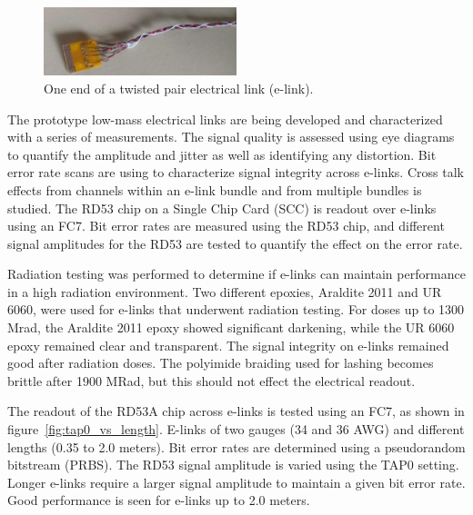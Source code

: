 \documentclass[a4paper,11pt]{article}
\begin{document}
\begin{figure}[htbp]
\centering
\includegraphics[width=0.5\textwidth,origin=c]{../figures/e-link-1.jpg}
\caption{
\label{fig:elink}
One end of a twisted pair electrical link (e-link).
}
\end{figure}




The prototype low-mass electrical links are being developed and characterized with a series of measurements.
The signal quality is assessed using eye diagrams to quantify the amplitude and jitter as well as identifying any distortion.
Bit error rate scans are using to characterize signal integrity across e-links.
Cross talk effects from channels within an e-link bundle and from multiple bundles is studied.
The RD53 chip on a Single Chip Card (SCC) is readout over e-links using an FC7.
Bit error rates are measured using the RD53 chip, and different signal amplitudes for the RD53 are tested to quantify the effect on the error rate.

Radiation testing was performed to determine if e-links can maintain performance in a high radiation environment.
Two different epoxies, Araldite 2011 and UR 6060, were used for e-links that underwent radiation testing.
For doses up to 1300 Mrad, the Araldite 2011 epoxy showed significant darkening, while the UR 6060 epoxy remained clear and transparent.
The signal integrity on e-links remained good after radiation doses.
The polyimide braiding used for lashing becomes brittle after 1900 MRad, but this should not effect the electrical readout.


The readout of the RD53A chip across e-links is tested using an FC7, as shown in figure~\ref{fig:tap0_vs_length}.
E-links of two gauges (34 and 36 AWG) and different lengths (0.35 to 2.0 meters).
Bit error rates are determined using a pseudorandom bitstream (PRBS).
The RD53 signal amplitude is varied using the TAP0 setting.
Longer e-links require a larger signal amplitude to maintain a given bit error rate.
Good performance is seen for e-links up to 2.0 meters.
\end{document}
